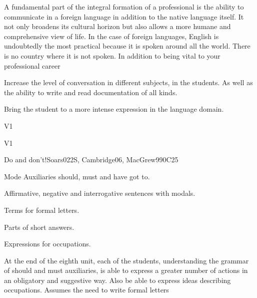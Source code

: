 \begin{syllabus}


\begin{justification}
A fundamental part of the integral formation of a professional is the ability to communicate in a foreign language in addition to the native language itself. It not only broadens its cultural horizon but also allows a more humane and comprehensive view of life. In the case of foreign languages, English is undoubtedly the most practical because it is spoken around
all the world. There is no country where it is not spoken. In addition to being vital to your professional career
\end{justification}

\begin{goals}
\item Increase the level of conversation in different subjects, in the students. As well as the ability to write and read documentation of all kinds.
\item Bring the student to a more intense expression in the language domain.
\end{goals}

\begin{outcomes}{V1}
\item {}
\end{outcomes}

\begin{competences}{V1}
\item {}
\end{competences}

\begin{unit}{Do and don't!}{}{Soars022S, Cambridge06, MacGrew99}{0}{C25}
   \begin{topics}
      \item Mode Auxiliaries should, must and have got to.
      \item Affirmative, negative and interrogative sentences with modals.
      \item Terms for formal letters.
      \item Parts of short answers.
      \item Expressions for occupations.
   \end{topics}

   \begin{learningoutcomes}
      \item At the end of the eighth unit, each of the students, understanding the grammar of should and must auxiliaries, is able to express a greater number of actions in an obligatory and suggestive way.
            Also be able to express ideas describing occupations. Assumes the need to write formal letters
   \end{learningoutcomes}
\end{unit}


\end{syllabus}
